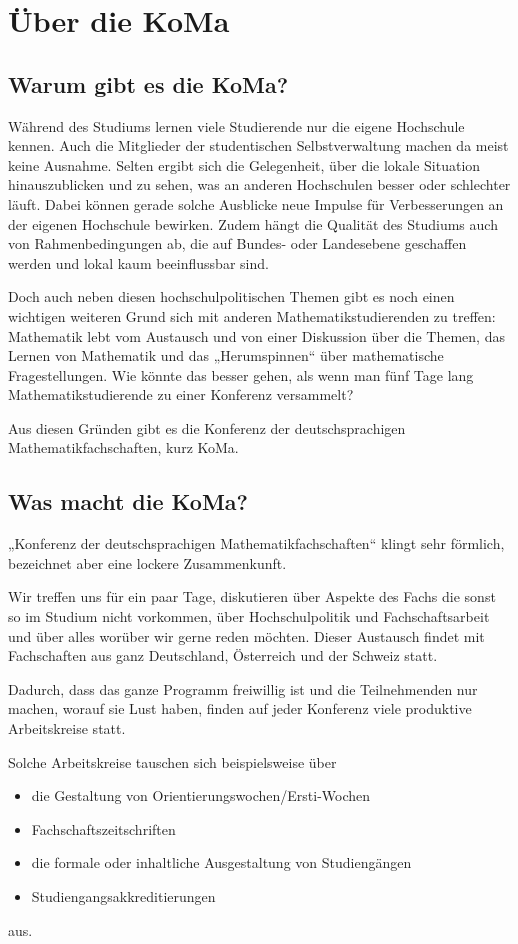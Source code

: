 \chapter{Über die KoMa}


\section{Warum gibt es die KoMa?}

Während des Studiums lernen viele Studierende nur die eigene Hochschule kennen.
Auch die Mitglieder der studentischen Selbstverwaltung machen da meist keine Ausnahme.
Selten ergibt sich die Gelegenheit, über die lokale Situation hinauszublicken und zu sehen, was an anderen Hochschulen besser oder schlechter läuft.
Dabei können gerade solche Ausblicke neue Impulse für Verbesserungen an der eigenen Hochschule bewirken.
Zudem hängt die Qualität des Studiums auch von Rahmenbedingungen ab, die auf Bundes- oder Landesebene geschaffen werden und lokal kaum beeinflussbar sind.

Doch auch neben diesen hochschulpolitischen Themen gibt es noch einen
wichtigen weiteren Grund sich mit anderen Mathematikstudierenden zu treffen:
Mathematik lebt vom Austausch und von einer Diskussion über
die Themen, das Lernen von Mathematik und das „Herumspinnen“ über mathematische
Fragestellungen. Wie könnte das besser gehen, als wenn man fünf Tage lang Mathematikstudierende zu einer Konferenz versammelt?

Aus diesen Gründen gibt es die Konferenz der deutschsprachigen Mathematikfachschaften, kurz KoMa.


\section{Was macht die KoMa?}
„Konferenz der deutschsprachigen Mathematikfachschaften“ klingt sehr förmlich, bezeichnet aber eine lockere Zusammenkunft.

Wir treffen uns für ein paar Tage, diskutieren über Aspekte des Fachs die sonst so im Studium nicht vorkommen,
über Hochschulpolitik und Fachschaftsarbeit und über alles worüber wir gerne reden möchten.
Dieser Austausch findet mit Fachschaften aus ganz Deutschland, Österreich und der Schweiz statt.

Dadurch, dass das ganze Programm freiwillig ist und die Teilnehmenden nur machen, worauf sie Lust haben,
finden auf jeder Konferenz viele produktive Arbeitskreise statt.

Solche Arbeitskreise tauschen sich beispielsweise über
\begin{itemize}
    \item die Gestaltung von Orientierungswochen/Ersti-Wochen
    \item Fachschaftszeitschriften
    \item die formale oder inhaltliche Ausgestaltung von Studiengängen
    \item Studiengangsakkreditierungen
\end{itemize}
aus.

